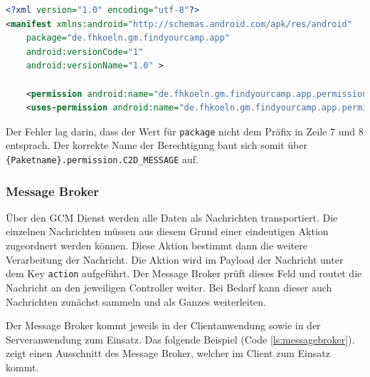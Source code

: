 \begin{lstlisting}[label=ls:androidmanifest,caption=Auszug aus der AndroidManifest.xml,language=xml]
<?xml version="1.0" encoding="utf-8"?>
<manifest xmlns:android="http://schemas.android.com/apk/res/android"
    package="de.fhkoeln.gm.findyourcamp.app"
    android:versionCode="1"
    android:versionName="1.0" >

    <permission android:name="de.fhkoeln.gm.findyourcamp.app.permission.C2D_MESSAGE" android:protectionLevel="signature" />
    <uses-permission android:name="de.fhkoeln.gm.findyourcamp.app.permission.C2D_MESSAGE" />
\end{lstlisting}

Der Fehler lag darin, dass der Wert für \texttt{package} nicht dem Präfix in Zeile 7 und 8 entsprach. Der korrekte Name der Berechtigung baut sich somit über \texttt{\{Paketname\}.permission.C2D\_MESSAGE} auf.


\subsubsection{Message Broker}

Über den GCM Dienst werden alle Daten als Nachrichten transportiert. Die einzelnen Nachrichten müssen aus diesem Grund einer eindeutigen Aktion zugeordnert werden können. Diese Aktion bestimmt dann die weitere Verarbeitung der Nachricht. Die Aktion wird im Payload der Nachricht unter dem Key \texttt{action} aufgeführt. Der Message Broker prüft dieses Feld und routet die Nachricht an den jeweiligen Controller weiter. Bei Bedarf kann dieser auch Nachrichten zunächst sammeln und als Ganzes weiterleiten.

Der Message Broker kommt jeweils in der Clientanwendung sowie in der Serveranwendung zum Einsatz. Das folgende Beispiel (Code \ref{ls:messagebroker}). zeigt einen Ausschnitt des Message Broker, welcher im Client zum Einsatz kommt.

